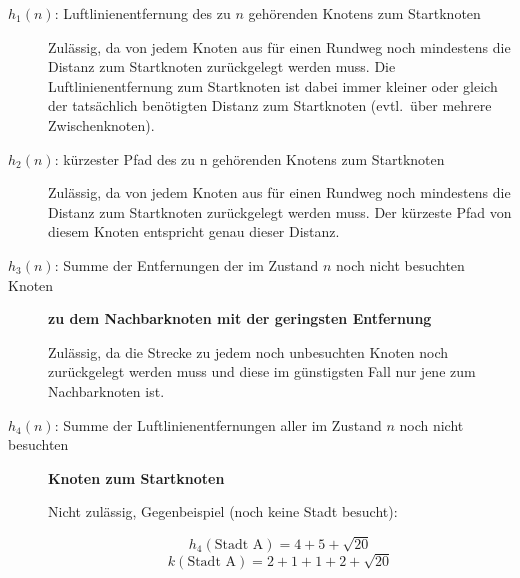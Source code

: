 \documentclass[a4paper,draft=false,oneside,12pt,ngerman]{scrreprt}
\begin{document}
\begin{description}
    \item[$h_1(n)$: Luftlinienentfernung des zu $n$ gehörenden Knotens zum Startknoten] 
        Zulässig, da von jedem Knoten aus für einen Rundweg noch mindestens die
        Distanz zum Startknoten zurückgelegt werden muss. Die
        Luftlinienentfernung zum Startknoten ist dabei immer kleiner oder gleich
        der tatsächlich benötigten Distanz zum Startknoten (evtl.\ über mehrere
        Zwischenknoten).
    \item[$h_2(n)$: kürzester Pfad des zu n gehörenden Knotens zum Startknoten] 
        Zulässig, da von jedem Knoten aus für einen Rundweg noch mindestens die
        Distanz zum Startknoten zurückgelegt werden muss. Der kürzeste Pfad von
        diesem Knoten entspricht genau dieser Distanz.
    \item[$h_3(n)$: Summe der Entfernungen der im Zustand $n$ noch nicht
        besuchten Knoten] \textbf{zu dem Nachbarknoten mit der geringsten
        Entfernung}

        Zulässig, da die Strecke zu jedem noch unbesuchten Knoten noch
        zurückgelegt werden muss und diese im günstigsten Fall nur jene zum
        Nachbarknoten ist.
    \item[$h_4(n)$: Summe der Luftlinienentfernungen aller im Zustand $n$ noch
        nicht besuchten] \textbf{Knoten zum Startknoten}

        Nicht zulässig, Gegenbeispiel (noch keine Stadt besucht):

        \begin{center}
        \vspace{0.4cm}
        \end{center}

        \[ h_4(\text{Stadt A}) = 4 + 5 + \sqrt{20} \]
        \[ k(\text{Stadt A}) = 2 + 1 + 1 + 2 + \sqrt{20} \]
\end{description} 
\end{document}
